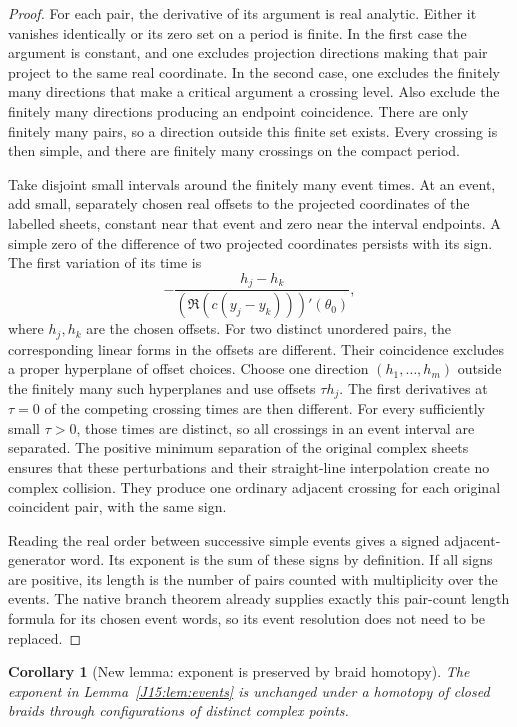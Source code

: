\documentclass[11pt,oneside]{report}
\newtheorem{corollary}[theorem]{Corollary}
\theoremstyle{definition}
\numberwithin{equation}{section}
\begin{document}
\begin{proof}
For each pair, the derivative of its argument is real analytic. Either it
vanishes identically or its zero set on a period is finite. In the first
case the argument is constant, and one excludes projection directions
making that pair project to the same real coordinate. In the second case,
one excludes the finitely many directions that make a critical argument
a crossing level. Also exclude the finitely many directions producing an
endpoint coincidence. There are only finitely many pairs, so a direction
outside this finite set exists. Every crossing is then simple, and there
are finitely many crossings on the compact period.

Take disjoint small intervals around the finitely many event times.
At an event, add small, separately chosen real offsets to the projected
coordinates of the labelled sheets, constant near that event and zero near
the interval endpoints. A simple zero of the difference of two projected
coordinates persists with its sign. The first variation of its time is
\[
 -\frac{h_j-h_k}{(\Re(c(y_j-y_k)))'(\theta_0)},
\]
where $h_j,h_k$ are the chosen offsets. For two distinct unordered pairs,
the corresponding linear forms in the offsets are different. Their
coincidence excludes a proper hyperplane of offset choices. Choose one direction $(h_1,\ldots,h_m)$ outside the finitely many
such hyperplanes and use offsets $\tau h_j$. The first derivatives
at $\tau=0$ of the competing crossing times are then different.
For every sufficiently small $\tau>0$, those times are distinct,
so all crossings in an event interval are separated. The positive minimum
separation of the original complex sheets ensures that these perturbations
and their straight-line interpolation create no complex collision.
They produce one ordinary adjacent crossing for each original coincident
pair, with the same sign.

Reading the real order between successive simple events gives a signed
adjacent-generator word. Its exponent is the sum of these signs by
definition. If all signs are positive, its length is the number of pairs
counted with multiplicity over the events. The native branch theorem
already supplies exactly this pair-count length formula for its chosen
event words, so its event resolution does not need to be replaced.
\end{proof}

\begin{corollary}[New lemma: exponent is preserved by braid homotopy]
\label{J15:cor:exp-homotopy}
The exponent in Lemma~\ref{J15:lem:events} is unchanged under a homotopy of
closed braids through configurations of distinct complex points.
\end{corollary}
\end{document}
